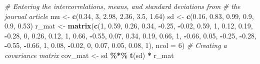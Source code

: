 \documentclass[
  11pt,
]{book}
\newenvironment{Shaded}{\begin{snugshade}}{\end{snugshade}}
\newcommand{\AttributeTok}[1]{\textcolor[rgb]{0.27,0.27,0.27}{#1}}
\newcommand{\CommentTok}[1]{\textcolor[rgb]{0.37,0.37,0.37}{\textit{#1}}}
\newcommand{\DecValTok}[1]{\textcolor[rgb]{0.06,0.06,0.06}{#1}}
\newcommand{\FloatTok}[1]{\textcolor[rgb]{0.06,0.06,0.06}{#1}}
\newcommand{\FunctionTok}[1]{\textcolor[rgb]{0.27,0.27,0.27}{\textbf{#1}}}
\newcommand{\NormalTok}[1]{#1}
\newcommand{\OtherTok}[1]{\textcolor[rgb]{0.37,0.37,0.37}{#1}}
\newcommand{\SpecialCharTok}[1]{\textcolor[rgb]{0.43,0.43,0.43}{\textbf{#1}}}
\begin{document}
\begin{Shaded}
\begin{Highlighting}[]
\CommentTok{\# Entering the intercorrelations, means, and standard deviations from}
\CommentTok{\# the journal article}
\NormalTok{mu }\OtherTok{\textless{}{-}} \FunctionTok{c}\NormalTok{(}\FloatTok{0.34}\NormalTok{, }\DecValTok{3}\NormalTok{, }\FloatTok{2.98}\NormalTok{, }\FloatTok{2.36}\NormalTok{, }\FloatTok{3.5}\NormalTok{, }\FloatTok{1.64}\NormalTok{)}
\NormalTok{sd }\OtherTok{\textless{}{-}} \FunctionTok{c}\NormalTok{(}\FloatTok{0.16}\NormalTok{, }\FloatTok{0.83}\NormalTok{, }\FloatTok{0.99}\NormalTok{, }\FloatTok{0.9}\NormalTok{, }\FloatTok{0.9}\NormalTok{, }\FloatTok{0.53}\NormalTok{)}
\NormalTok{r\_mat }\OtherTok{\textless{}{-}} \FunctionTok{matrix}\NormalTok{(}\FunctionTok{c}\NormalTok{(}\DecValTok{1}\NormalTok{, }\FloatTok{0.59}\NormalTok{, }\FloatTok{0.26}\NormalTok{, }\FloatTok{0.34}\NormalTok{, }\SpecialCharTok{{-}}\FloatTok{0.25}\NormalTok{, }\SpecialCharTok{{-}}\FloatTok{0.02}\NormalTok{, }\FloatTok{0.59}\NormalTok{, }\DecValTok{1}\NormalTok{, }\FloatTok{0.12}\NormalTok{, }\FloatTok{0.19}\NormalTok{,}
    \SpecialCharTok{{-}}\FloatTok{0.28}\NormalTok{, }\DecValTok{0}\NormalTok{, }\FloatTok{0.26}\NormalTok{, }\FloatTok{0.12}\NormalTok{, }\DecValTok{1}\NormalTok{, }\FloatTok{0.66}\NormalTok{, }\SpecialCharTok{{-}}\FloatTok{0.55}\NormalTok{, }\FloatTok{0.07}\NormalTok{, }\FloatTok{0.34}\NormalTok{, }\FloatTok{0.19}\NormalTok{, }\FloatTok{0.66}\NormalTok{, }\DecValTok{1}\NormalTok{, }\SpecialCharTok{{-}}\FloatTok{0.66}\NormalTok{,}
    \FloatTok{0.05}\NormalTok{, }\SpecialCharTok{{-}}\FloatTok{0.25}\NormalTok{, }\SpecialCharTok{{-}}\FloatTok{0.28}\NormalTok{, }\SpecialCharTok{{-}}\FloatTok{0.55}\NormalTok{, }\SpecialCharTok{{-}}\FloatTok{0.66}\NormalTok{, }\DecValTok{1}\NormalTok{, }\FloatTok{0.08}\NormalTok{, }\SpecialCharTok{{-}}\FloatTok{0.02}\NormalTok{, }\DecValTok{0}\NormalTok{, }\FloatTok{0.07}\NormalTok{, }\FloatTok{0.05}\NormalTok{, }\FloatTok{0.08}\NormalTok{,}
    \DecValTok{1}\NormalTok{), }\AttributeTok{ncol =} \DecValTok{6}\NormalTok{)}
\CommentTok{\# Creating a covariance matrix}
\NormalTok{cov\_mat }\OtherTok{\textless{}{-}}\NormalTok{ sd }\SpecialCharTok{\%*\%} \FunctionTok{t}\NormalTok{(sd) }\SpecialCharTok{*}\NormalTok{ r\_mat}


\end{Highlighting}
\end{Shaded}
\end{document}
